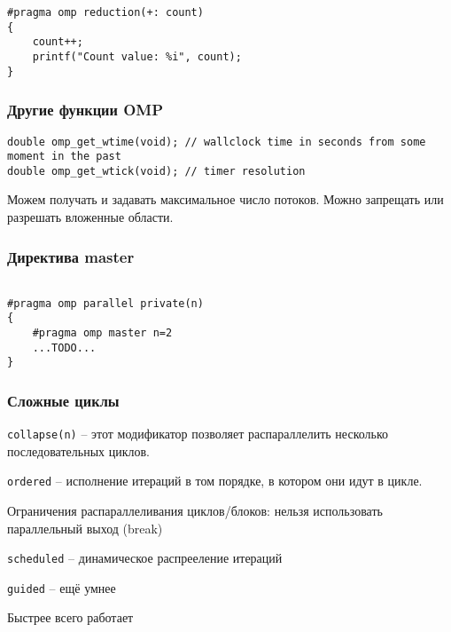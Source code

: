 \documentclass[main.tex]{subfiles}
\begin{document}
\begin{verbatim}
#pragma omp reduction(+: count)
{
	count++;
	printf("Count value: %i", count);
}
\end{verbatim}

\subsubsection{Другие функции OMP}

\begin{verbatim}
double omp_get_wtime(void); // wallclock time in seconds from some moment in the past
double omp_get_wtick(void); // timer resolution
\end{verbatim}

Можем получать и задавать максимальное число потоков.
Можно запрещать или разрешать вложенные области.

\subsubsection{Директива master}

\begin{verbatim}

#pragma omp parallel private(n)
{
	#pragma omp master n=2
	...TODO...
}
\end{verbatim}

\subsubsection{ Сложные циклы }

\texttt{collapse(n)} -- этот модификатор позволяет распараллелить несколько последовательных циклов.

\texttt{ordered} -- исполнение итераций в том порядке, в котором они идут в цикле.

Ограничения распараллеливания циклов/блоков: нельзя использовать параллельный выход (break)

\texttt{scheduled} -- динамическое распрееление итераций

\texttt{guided} -- ещё умнее

Быстрее всего работает 
\end{document}
